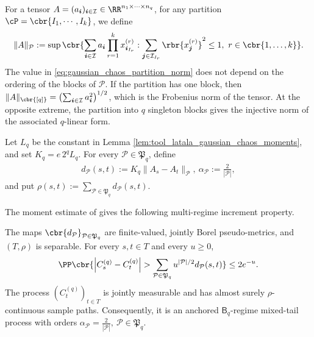 \documentclass[11pt]{article}
\begin{document}
For a tensor
$A=(a_{\boldsymbol i})_{\boldsymbol i\in\mathcal I}
\in\RR^{n_1\times\cdots\times n_q}$, for any partition $\cP=\cbr{I_1,\cdots,I_k}$, we define
\begin{align}
\|A\|_{\mathcal P}
:=
\sup\cbr{
\sum_{\boldsymbol i\in\mathcal I}
a_{\boldsymbol i}
\prod_{r=1}^k
x^{(r)}_{\boldsymbol i_{I_r}}
:
\sum_{\boldsymbol j\in\mathcal I_{I_r}}
\rbr{x^{(r)}_{\boldsymbol j}}^2
\le1,
\ 
r\in\cbr{1,\ldots,k}
}.
\label{eq:gaussian_chaos_partition_norm}
\end{align}
The value in \eqref{eq:gaussian_chaos_partition_norm} does not depend
on the ordering of the blocks of $\mathcal P$. If the partition has one
block, then $
\|A\|_{\cbr{[q]}}
=
\left(
\sum_{\boldsymbol i\in\mathcal I}a_{\boldsymbol i}^2
\right)^{1/2}$, which is the Frobenius norm of the tensor. At the opposite extreme, the
partition into $q$ singleton blocks gives the injective norm of the
associated $q$-linear form.

Let $L_q$ be the constant in Lemma
\ref{lem:tool_latala_gaussian_chaos_moments}, and set
$K_q
=
e\,2^qL_q$. For every $\mathcal P\in\mathfrak P_q$, define
\begin{align}
d_{\mathcal P}(s,t)
:=
K_q\|A_s-A_t\|_{\mathcal P},
\ 
\alpha_{\mathcal P}
:=
\frac{2}{|\mathcal P|},
\label{eq:gaussian_chaos_regime_metrics}
\end{align}
and put $\rho(s,t)
:=
\sum_{\mathcal P\in\mathfrak P_q}d_{\mathcal P}(s,t)$.

The moment estimate of \citet{latala2006estimates} gives the following
multi-regime increment property.

\begin{proposition}
\label{prop:higher_order_gaussian_chaos_multi_regime}
The maps
$\cbr{d_{\mathcal P}}_{\mathcal P\in\mathfrak P_q}$ are
finite-valued, jointly Borel pseudo-metrics, and $(T,\rho)$ is
separable. For every $s,t\in T$ and every $u\ge0$,
\begin{align}
\PP\cbr{
\left|C_s^{(q)}-C_t^{(q)}\right|
>
\sum_{\mathcal P\in\mathfrak P_q}
u^{|\mathcal P|/2}d_{\mathcal P}(s,t)
}
\le
2e^{-u}.
\label{eq:higher_order_gaussian_chaos_increment}
\end{align}
The process $(C_t^{(q)})_{t\in T}$ is jointly measurable and has
almost surely $\rho$-continuous sample paths. Consequently, it is an
anchored $\mathsf B_q$-regime mixed-tail process with orders
$\alpha_{\mathcal P}
=
\frac{2}{|\mathcal P|},
\ 
\mathcal P\in\mathfrak P_q$.
\end{proposition}
\end{document}
